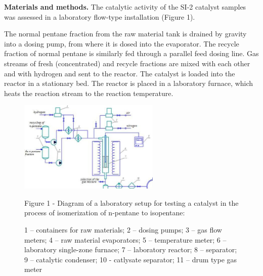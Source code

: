 \begin{multicols}{2}
{\bfseries Materials and methods.} The catalytic activity of the SI-2
catalyst samples was assessed in a laboratory flow-type installation
(Figure 1).

The normal pentane fraction from the raw material tank is drained by
gravity into a dosing pump, from where it is dosed into the evaporator.
The recycle fraction of normal pentane is similarly fed through a
parallel feed dosing line. Gas streams of fresh (concentrated) and
recycle fractions are mixed with each other and with hydrogen and sent
to the reactor. The catalyst is loaded into the reactor in a stationary
bed. The reactor is placed in a laboratory furnace, which heats the
reaction stream to the reaction temperature.
\end{multicols}

\begin{figure}[H]
	\centering
	\includegraphics[width=0.6\textwidth]{assets/1053}
	\caption*{Figure 1 - Diagram of a laboratory setup for testing a catalyst in the process of isomerization of n-pentane to isopentane:}
	\caption*{1 -- containers for raw materials; 2 -- dosing pumps; 3 -- gas flow meters; 4 -- raw material evaporators; 5 -- temperature meter; 6 -- laboratory single-zone furnace; 7 -- laboratory reactor; 8 -- separator; 9 -- catalytic condenser; 10 - catlysate separator; 11 -- drum type gas meter}
\end{figure}

